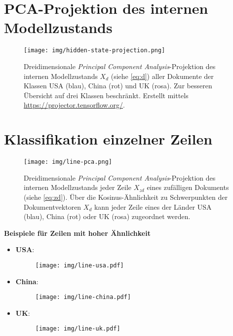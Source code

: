 \documentclass[bachelor,german]{info1thesis}
\begin{document}
\chapter{PCA-Projektion des internen Modellzustands}
\label{app:hidden-state-projection}

\begin{figure}[h!]
\centering
\texttt{[image: img/hidden-state-projection.png]}
\caption{Dreidimensionale \textit{Principal Component Analysis}-Projektion des internen Modellzustands $X_d$ (siehe \autoref{eq:d}) aller Dokumente der Klassen USA (blau), China (rot) und UK (rosa). Zur besseren Übersicht auf drei Klassen beschränkt. Erstellt mittels \url{https://projector.tensorflow.org/}.}
\end{figure}

\chapter{Klassifikation einzelner Zeilen}
\label{app:line-projection}

\begin{figure}[h!]
\centering
\texttt{[image: img/line-pca.png]}
\caption{Dreidimensionale \textit{Principal Component Analysis}-Projektion des internen Modellzustands jeder Zeile $X_{zd}$ eines zufälligen Dokuments (siehe \autoref{eq:zd}). Über die Kosinus-Ähnlichkeit zu Schwerpunkten der Dokumentvektoren $X_d$ kann jeder Zeile eines der Länder USA (blau), China (rot) oder UK (rosa) zugeordnet werden.}
\end{figure}

\textbf{Beispiele für Zeilen mit hoher Ähnlichkeit}
\begin{itemize}
\item \textbf{USA}:%
\vspace{-.5em}
\begin{figure}[h!]
\centering
\texttt{[image: img/line-usa.pdf]}
\end{figure}
\vspace{-1.5em}
\item \textbf{China}:%
\vspace{-.5em}
\begin{figure}[h!]
\centering
\texttt{[image: img/line-china.pdf]}
\end{figure}
\vspace{-1.5em}
\item \textbf{UK}:%
\vspace{-.5em}
\begin{figure}[h!]
\centering
\texttt{[image: img/line-uk.pdf]}
\end{figure}
\end{itemize}

\end{document}
